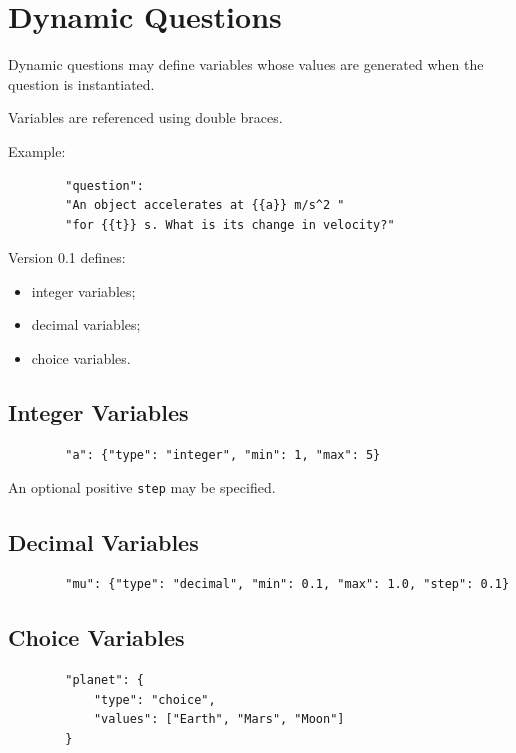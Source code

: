 \documentclass[11pt]{article}
\begin{document}
	\section{Dynamic Questions}
	
	Dynamic questions may define variables whose values are generated when the
	question is instantiated.
	
	Variables are referenced using double braces.
	
	Example:
	
	\begin{lstlisting}
		"question":
		"An object accelerates at {{a}} m/s^2 "
		"for {{t}} s. What is its change in velocity?"
	\end{lstlisting}
	
	Version 0.1 defines:
	
	\begin{itemize}
		\item integer variables;
		\item decimal variables;
		\item choice variables.
	\end{itemize}
	
	\subsection{Integer Variables}
	
	\begin{lstlisting}
		"a": {"type": "integer", "min": 1, "max": 5}
	\end{lstlisting}
	
	An optional positive \texttt{step} may be specified.
	
	\subsection{Decimal Variables}
	
	\begin{lstlisting}
		"mu": {"type": "decimal", "min": 0.1, "max": 1.0, "step": 0.1}
	\end{lstlisting}
	
	\subsection{Choice Variables}
	
	\begin{lstlisting}
		"planet": {
			"type": "choice",
			"values": ["Earth", "Mars", "Moon"]
		}
	\end{lstlisting}
	
\end{document}
